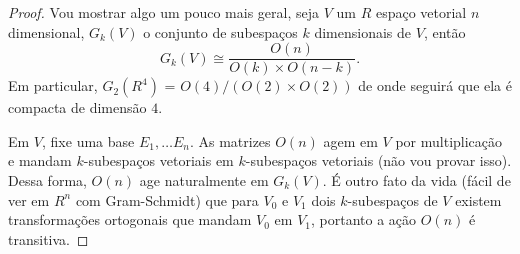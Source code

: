 \begin{exercise}
    \label{prob:l3:1}
\end{exercise}
\begin{proof}
    Vou mostrar algo um pouco mais geral, seja $V$ um $R$ espaço vetorial $n$ dimensional, $G_k(V)$ o conjunto 
    de subespaços $k$ dimensionais de $V$, então 
    $$G_k(V) \cong \frac{O(n)}{O(k) \times O(n-k)}.$$
    Em particular, $G_2(R^4)$ = $O(4)/(O(2)\times O(2))$ de onde seguirá que ela é compacta de dimensão $4$.
    
    Em $V$, fixe uma base $E_1, \dots E_n$. As matrizes $O(n)$ agem em $V$ por multiplicação e mandam $k$-subespaços
    vetoriais em $k$-subespaços vetoriais (não vou provar isso). Dessa forma, $O(n)$ age naturalmente em $G_k(V)$.
    É outro fato da vida (fácil de ver em $R^n$ com Gram-Schmidt) que para $V_0$ e $V_1$ dois $k$-subespaços de $V$
    existem transformações ortogonais que mandam $V_0$ em $V_1$, portanto a ação $O(n)$ é transitiva. 


\end{proof}
